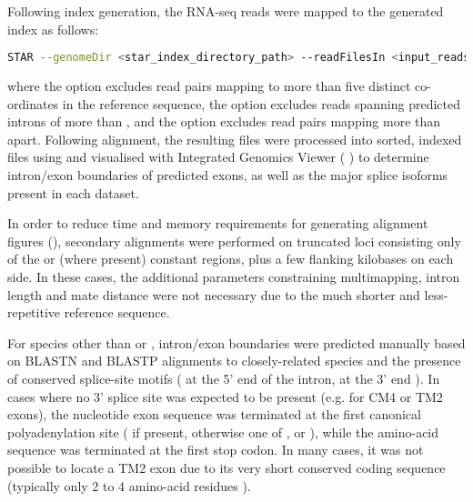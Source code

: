 \noindent Following index generation, the RNA-seq reads were mapped to the generated index as follows:

\begin{lstlisting}[language=bash]
STAR --genomeDir <star_index_directory_path> --readFilesIn <input_reads> --outFilterMultimapNmax 5 --alignIntronMax 10000 --alignMatesGapMax 10000
\end{lstlisting}

\noindent where the  option excludes read pairs mapping to more than five distinct co-ordinates in the reference sequence, the  option excludes reads spanning predicted introns of more than , and the  option excludes read pairs mapping more than  apart. Following alignment, the resulting  files were processed into sorted, indexed  files using  \parencite{li2009samtools} and visualised with Integrated Genomics Viewer ( \parencite{robinson2011igv,thorvaldsdottir2013igv}) to determine intron/exon boundaries of predicted exons, as well as the major splice isoforms present in each dataset.

In order to reduce time and memory requirements for generating alignment figures (), secondary alignments were performed on truncated loci consisting only of the  or (where present)  constant regions, plus a few flanking kilobases on each side. In these cases, the additional parameters constraining multimapping, intron length and mate distance were not necessary due to the much shorter and less-repetitive reference sequence.

For species other than \Nfu or \Xma, intron/exon boundaries were predicted manually based on BLASTN and BLASTP alignments to closely-related species and the presence of conserved splice-site motifs ( at the 5' end of the intron,  at the 3' end \parencite{shapiro1987splice}). In cases where no 3' splice site was expected to be present (e.g. for CM4 or TM2 exons), the nucleotide exon sequence was terminated at the first canonical polyadenylation site ( if present, otherwise one of ,  or  \parencite{ulitsky2012polya}), while the amino-acid sequence was terminated at the first stop codon. In many cases, it was not possible to locate a TM2 exon due to its very short conserved coding sequence (typically only 2 to 4 amino-acid residues \parencite{bao2010stickleback,danilova2005zebrafish}).

